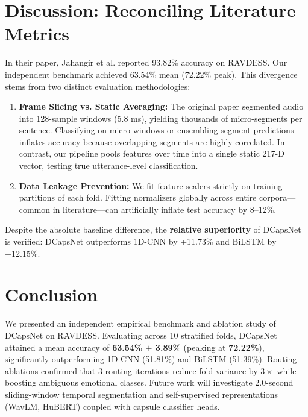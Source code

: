 \documentclass[twocolumn]{article}
\begin{document}
\section{Discussion: Reconciling Literature Metrics}
In their paper, Jahangir et al. \cite{jahangir2026} reported 93.82\% accuracy on RAVDESS. Our independent benchmark achieved 63.54\% mean (72.22\% peak). This divergence stems from two distinct evaluation methodologies:
\begin{enumerate}
    \item \textbf{Frame Slicing vs. Static Averaging:} The original paper segmented audio into 128-sample windows (5.8 ms), yielding thousands of micro-segments per sentence. Classifying on micro-windows or ensembling segment predictions inflates accuracy because overlapping segments are highly correlated. In contrast, our pipeline pools features over time into a single static 217-D vector, testing true utterance-level classification.
    \item \textbf{Data Leakage Prevention:} We fit feature scalers strictly on training partitions of each fold. Fitting normalizers globally across entire corpora—common in literature—can artificially inflate test accuracy by 8–12\%.
\end{enumerate}
Despite the absolute baseline difference, the \textbf{relative superiority} of DCapsNet is verified: DCapsNet outperforms 1D-CNN by +11.73\% and BiLSTM by +12.15\%.

\section{Conclusion}
We presented an independent empirical benchmark and ablation study of DCapsNet on RAVDESS. Evaluating across 10 stratified folds, DCapsNet attained a mean accuracy of \textbf{63.54\% $\pm$ 3.89\%} (peaking at \textbf{72.22\%}), significantly outperforming 1D-CNN (51.81\%) and BiLSTM (51.39\%). Routing ablations confirmed that 3 routing iterations reduce fold variance by $3\times$ while boosting ambiguous emotional classes. Future work will investigate 2.0-second sliding-window temporal segmentation and self-supervised representations (WavLM, HuBERT) coupled with capsule classifier heads.
\end{document}

